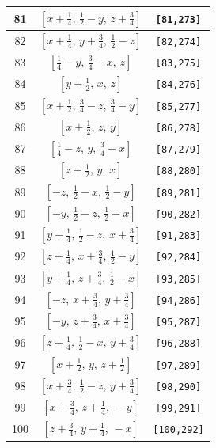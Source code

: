 \documentclass[fleqn,8pt]{jsarticle}
\begin{document}
\begin{longtable}{ccc}
81 & $\left[ x + \frac{1}{4},\, \frac{1}{2} - y,\, z + \frac{3}{4} \right]$ & {\tt [81,273]} \\ \hline
82 & $\left[ x + \frac{1}{4},\, y + \frac{3}{4},\, \frac{1}{2} - z \right]$ & {\tt [82,274]} \\ \hline
83 & $\left[ \frac{1}{4} - y,\, \frac{3}{4} - x,\, z \right]$ & {\tt [83,275]} \\ \hline
84 & $\left[ y + \frac{1}{2},\, x,\, z \right]$ & {\tt [84,276]} \\ \hline
85 & $\left[ x + \frac{1}{2},\, \frac{3}{4} - z,\, \frac{3}{4} - y \right]$ & {\tt [85,277]} \\ \hline
86 & $\left[ x + \frac{1}{2},\, z,\, y \right]$ & {\tt [86,278]} \\ \hline
87 & $\left[ \frac{1}{4} - z,\, y,\, \frac{3}{4} - x \right]$ & {\tt [87,279]} \\ \hline
88 & $\left[ z + \frac{1}{2},\, y,\, x \right]$ & {\tt [88,280]} \\ \hline
89 & $\left[ - z,\, \frac{1}{2} - x,\, \frac{1}{2} - y \right]$ & {\tt [89,281]} \\ \hline
90 & $\left[ - y,\, \frac{1}{2} - z,\, \frac{1}{2} - x \right]$ & {\tt [90,282]} \\ \hline
91 & $\left[ y + \frac{1}{4},\, \frac{1}{2} - z,\, x + \frac{3}{4} \right]$ & {\tt [91,283]} \\ \hline
92 & $\left[ z + \frac{1}{4},\, x + \frac{3}{4},\, \frac{1}{2} - y \right]$ & {\tt [92,284]} \\ \hline
93 & $\left[ y + \frac{1}{4},\, z + \frac{3}{4},\, \frac{1}{2} - x \right]$ & {\tt [93,285]} \\ \hline
94 & $\left[ - z,\, x + \frac{3}{4},\, y + \frac{3}{4} \right]$ & {\tt [94,286]} \\ \hline
95 & $\left[ - y,\, z + \frac{3}{4},\, x + \frac{3}{4} \right]$ & {\tt [95,287]} \\ \hline
96 & $\left[ z + \frac{1}{4},\, \frac{1}{2} - x,\, y + \frac{3}{4} \right]$ & {\tt [96,288]} \\ \hline
97 & $\left[ x + \frac{1}{2},\, y,\, z + \frac{1}{2} \right]$ & {\tt [97,289]} \\ \hline
98 & $\left[ x + \frac{3}{4},\, \frac{1}{2} - z,\, y + \frac{3}{4} \right]$ & {\tt [98,290]} \\ \hline
99 & $\left[ x + \frac{3}{4},\, z + \frac{1}{4},\, - y \right]$ & {\tt [99,291]} \\ \hline
100 & $\left[ z + \frac{3}{4},\, y + \frac{1}{4},\, - x \right]$ & {\tt [100,292]} \\ \hline

\end{longtable}
\end{document}
